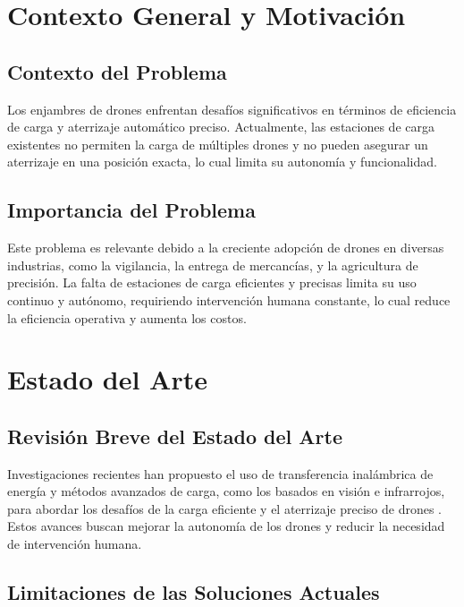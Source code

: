 
\section{Contexto General y Motivación}

\subsection{Contexto del Problema}

Los enjambres de drones enfrentan desafíos significativos en términos de eficiencia de carga y aterrizaje automático preciso. Actualmente, las estaciones de carga existentes no permiten la carga de múltiples drones y no pueden asegurar un aterrizaje en una posición exacta, lo cual limita su autonomía y funcionalidad.

\subsection{Importancia del Problema}

Este problema es relevante debido a la creciente adopción de drones en diversas industrias, como la vigilancia, la entrega de mercancías, y la agricultura de precisión. La falta de estaciones de carga eficientes y precisas limita su uso continuo y autónomo, requiriendo intervención humana constante, lo cual reduce la eficiencia operativa y aumenta los costos.

\section{Estado del Arte}

\subsection{Revisión Breve del Estado del Arte}

Investigaciones recientes han propuesto el uso de transferencia inalámbrica de energía y métodos avanzados de carga, como los basados en visión e infrarrojos, para abordar los desafíos de la carga eficiente y el aterrizaje preciso de drones \cite{Gupta2022}. Estos avances buscan mejorar la autonomía de los drones y reducir la necesidad de intervención humana.

\subsection{Limitaciones de las Soluciones Actuales}

